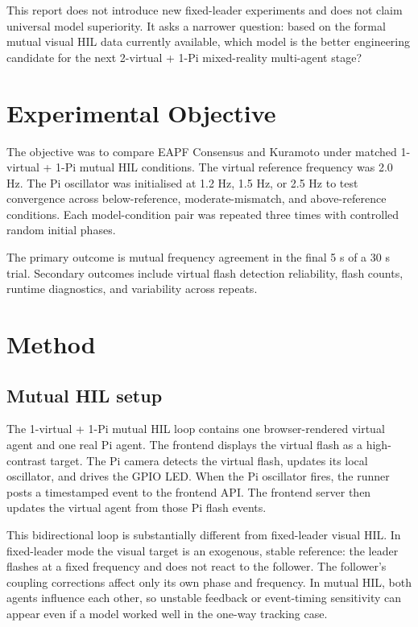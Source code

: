 \documentclass[11pt,a4paper]{article}
\begin{document}
This report does not introduce new fixed-leader experiments and does not claim
universal model superiority. It asks a narrower question: based on the formal
mutual visual HIL data currently available, which model is the better
engineering candidate for the next 2-virtual + 1-Pi mixed-reality multi-agent
stage?

\section{Experimental Objective}

The objective was to compare EAPF Consensus and Kuramoto under matched
1-virtual + 1-Pi mutual HIL conditions. The virtual reference frequency was
2.0 Hz. The Pi oscillator was initialised at 1.2 Hz, 1.5 Hz, or 2.5 Hz to
test convergence across below-reference, moderate-mismatch, and above-reference
conditions. Each model-condition pair was repeated three times with controlled
random initial phases.

The primary outcome is mutual frequency agreement in the final 5 s of a
30 s trial. Secondary outcomes include virtual flash detection reliability,
flash counts, runtime diagnostics, and variability across repeats.

\section{Method}

\subsection{Mutual HIL setup}

The 1-virtual + 1-Pi mutual HIL loop contains one browser-rendered virtual
agent and one real Pi agent. The frontend displays the virtual flash as a
high-contrast target. The Pi camera detects the virtual flash, updates its
local oscillator, and drives the GPIO LED. When the Pi oscillator fires, the
runner posts a timestamped event to the frontend API. The frontend server then
updates the virtual agent from those Pi flash events.

This bidirectional loop is substantially different from fixed-leader visual
HIL. In fixed-leader mode the visual target is an exogenous, stable reference:
the leader flashes at a fixed frequency and does not react to the follower.
The follower's coupling corrections affect only its own phase and frequency.
In mutual HIL, both agents influence each other, so unstable feedback or
event-timing sensitivity can appear even if a model worked well in the one-way
tracking case.
\end{document}
